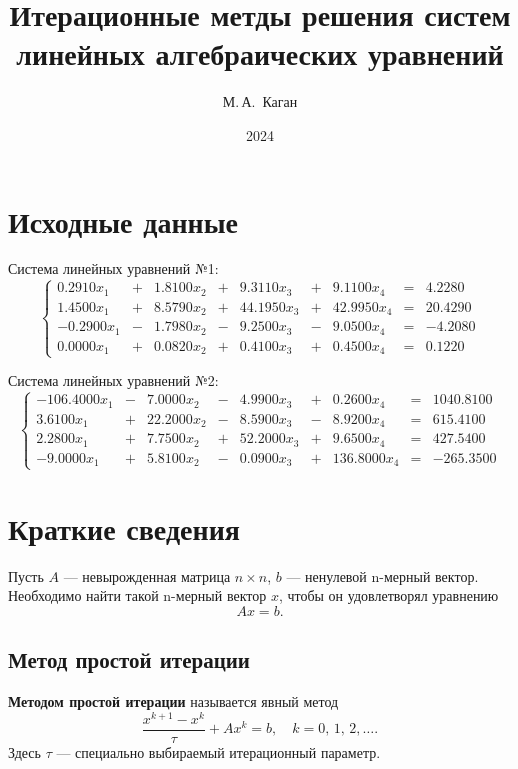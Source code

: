 \documentclass[12pt, a4paper]{article}
\title{Итерационные метды решения систем линейных алгебраических уравнений}
\author{М.\,А.~Каган}
\date{2024}
\begin{document}
	\maketitle
	\tableofcontents
	
	\newpage
	
	\section{Исходные данные}
	
	Система линейных уравнений №1:
	\[
	\left \{ \begin{array}{ccccccccc}
		0.2910 x_1  & +   &   1.8100 x_2 & +   &     9.3110 x_3 & +    &    9.1100 x_4 & = & 4.2280\\
		1.4500  x_1 & + &     8.5790 x_2 & +  &     44.1950 x_3  & +  &    42.9950 x_4  & = & 20.4290\\
		-0.2900 x_1  & - &     1.7980 x_2 & - &      9.2500 x_3   & - &    9.0500 x_4 & = & -4.2080  \\
		0.0000  x_1  & + &     0.0820 x_2  & +  &     0.4100 x_3 & +  &      0.4500 x_4 & = & 0.1220
	\end{array}	\right.
	\]
	 
	Система линейных уравнений №2:
	 \[
	 \left \{ \begin{array}{ccccccccc}
	 -106.4000 x_1 & - & 7.0000 x_2 & - & 4.9900 x_3 & + & 0.2600 x_4 & = & 1040.8100\\
	3.6100 x_1 & + & 22.2000 x_2 & - & 8.5900 x_3 & - & 8.9200 x_4 & = & 615.4100 \\
	 2.2800 x_1 & + & 7.7500 x_2 & + & 52.2000 x_3 & + & 9.6500 x_4 & = & 427.5400 \\
	 -9.0000 x_1 & + & 5.8100 x_2 & - & 0.0900 x_3 & + & 136.8000 x_4 & = & -265.3500
	\end{array}	\right.
	 \]  
	\section{Краткие сведения}
	Пусть $A$ --- невырожденная матрица $n \times n$, $b$ --- ненулевой n-мерный вектор. Необходимо найти такой n-мерный вектор $x$, чтобы он удовлетворял уравнению
	\begin{equation}
		\label{eq}
		A x = b.
	\end{equation}
  
	\subsection{Метод простой итерации}
\textbf{Методом простой итерации} называется явный метод
$$
\frac{x^{k+1} - x^k}{\tau} + Ax^k = b, \quad k = 0, \, 1, \, 2, \dots.
$$
Здесь $\tau$ ---  специально выбираемый итерационный параметр.
\end{document}
